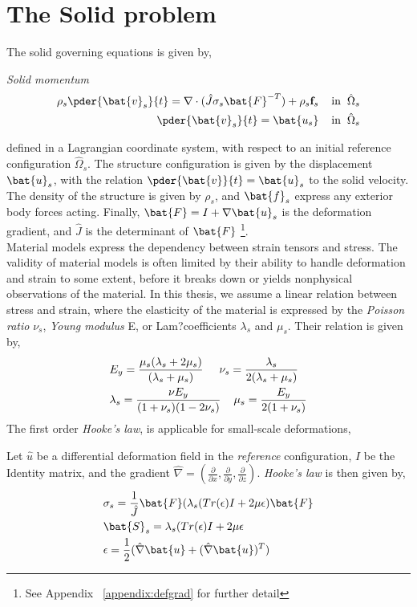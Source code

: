 \section{The Solid problem}
\label{sec:solprob}
The solid governing equations is given by, 
\begin{equat}
\textit{Solid momentum}
\begin{align}
\rho_s \pder{\bat{v}_s}{t} = \nabla \cdot ( \hat{J} \sigma_s \bat{F}^{-T})  + \rho_s \mathbf{f}_s
\hspace{4mm} \text{in} \hspace{2mm} \hat{\Omega}_s \\
\pder{\bat{v}_s}{t} = \bat{u_s} \hspace{4mm} \text{in} \hspace{2mm}  \hat{\Omega}_s
\end{align}
\end{equat}
defined in a Lagrangian coordinate system, with respect to an initial reference configuration $\hat{\Omega}_s$. The structure configuration is given by the displacement $\bat{u}_s$, with the relation $\pder{\bat{v}}{t} = \bat{u}_s$ to the solid velocity. The density of the structure is given by $\rho_s$, and $\bat{f}_s$ express any exterior body forces acting. Finally, $\bat{F} = I + \nabla \bat{u}_s$ is the deformation gradient, and $\hat{J}$ is the determinant of $\bat{F}$ \footnote{See Appendix ~\ref{appendix:defgrad}  for further detail}. \\
Material models express the dependency between strain tensors and stress. The validity of material models is often limited by their ability to handle deformation and strain to some extent, before it breaks down or yields nonphysical observations of the material. In this thesis, we assume a linear relation between stress and strain, where the elasticity of the material is expressed by the \textit{Poisson ratio} $\nu_s$, \textit{Young modulus} E, or Lam?coefficients  $\lambda_s$ and $\mu_s$. Their relation is given by,
\begin{align*}
&E_y = \frac{ \mu_s ( \lambda_s + 2 \mu_s) }{ ( \lambda_s + \mu_s ) } 
\hspace{5mm} \nu_s = \frac{\lambda_s}{2(\lambda_s + \mu_s)} \\
&\lambda_s = \frac{\nu E_y}{(1 + \nu_s)(1 - 2\nu_s)} \hspace{4mm} \mu_s = \frac{E_y}{2(1 + \nu_s)} 
\end{align*}
The first order \textit{Hooke's law}, is applicable for small-scale deformations,
\begin{defn}
Let $\hat{u}$ be a differential deformation field in the \textit{reference} configuration, $I$ be the Identity matrix, and the gradient $\hat{\nabla} = (\frac{\partial}{\partial x}, \frac{\partial}{\partial y}, \frac{\partial}{\partial z}) $. \textit{Hooke's law} is then given by,
\begin{align*}
&\sigma_s = \frac{1}{\hat{J}} \bat{F}(\lambda_s(Tr(\epsilon) I + 2 \mu  \epsilon)\bat{F} \\
&\bat{S}_s = \lambda_s(Tr(\epsilon) I + 2 \mu \epsilon \\
&\epsilon = \frac{1}{2}(\hat{\nabla} \bat{u} + (\hat{\nabla} \bat{u})^T ) 
\end{align*} 
\end{defn}
